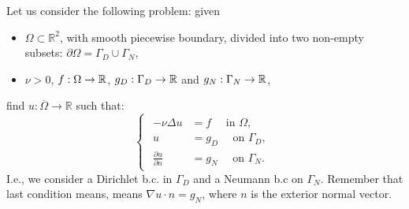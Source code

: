 \documentclass[12pt]{article}
\newcommand{\R}{{\mathbb R}}
\begin{document}
Let us consider the following problem: given
\begin{itemize}
\item $\Omega\subset\R^2$, with smooth piecewise boundary, divided into
  two non-empty subsets:
  $\partial\Omega=\Gamma_D\cup\Gamma_N$,
\item $\nu>0$, $f: \Omega \to {\mathbb R}$, $g_D:\Gamma_D\to{\mathbb R}$ and
$g_N:\Gamma_N\to{\mathbb R}$,
\end{itemize}
find $u:\overline\Omega \rightarrow \R$ such that:
\begin{equation}
  \label{eq:poisson-mixto}
  \begin{cases}
    \begin{aligned}
      -\nu\Delta u &= f \quad \text{ in } \Omega, \\
      u &= g_D \quad \text{ on } \Gamma_D, \\
      \frac{\partial u}{\partial n} &= g_N \quad \text{ on } \Gamma_N.
    \end{aligned}
  \end{cases}
\end{equation}
I.e., we consider a Dirichlet b.c. in $\Gamma_D$ and
a Neumann b.c on $\Gamma_N$. Remember that last condition means, means
$\nabla u \cdot n=g_N$, where $n$ is the exterior normal vector.
\end{document}
